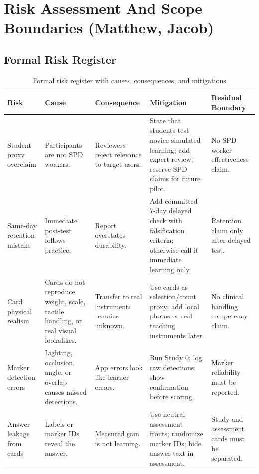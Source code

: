 \documentclass[10pt,a4paper]{article}
\begin{document}

\section{Risk Assessment And Scope Boundaries \hfill {\normalfont\small (Matthew, Jacob)}}
\label{sec:risk-assessment-and-scope-boundaries}
\subsection{Formal Risk Register}

\begin{table}[H]
\centering
\caption{Formal risk register with causes, consequences, and mitigations}
\label{tab:formal-risk-register-with-causes-consequences-and-mitigations}
\small\renewcommand{\arraystretch}{1.15}\setlength{\tabcolsep}{3pt}
\begin{tabularx}{\textwidth}{|>{\raggedright\arraybackslash}p{2.2cm}|>{\raggedright\arraybackslash}X|>{\raggedright\arraybackslash}p{2.5cm}|>{\raggedright\arraybackslash}X|>{\raggedright\arraybackslash}p{2.3cm}|}
\hline
Risk & Cause & Consequence & Mitigation & Residual Boundary \\
\hline
Student proxy overclaim & Participants are not SPD workers. & Reviewers reject relevance to target users. & State that students test novice simulated learning; add expert review; reserve SPD claims for future pilot. & No SPD worker effectiveness claim. \\
\hline
Same-day retention mistake & Immediate post-test follows practice. & Report overstates durability. & Add committed 7-day delayed check with falsification criteria; otherwise call it immediate learning only. & Retention claim only after delayed test. \\
\hline
Card physical realism & Cards do not reproduce weight, scale, tactile handling, or real visual lookalikes. & Transfer to real instruments remains unknown. & Use cards as selection/count proxy; add local photos or real teaching instruments later. & No clinical handling competency claim. \\
\hline
Marker detection errors & Lighting, occlusion, angle, or overlap causes missed detections. & App errors look like learner errors. & Run Study 0; log raw detections; show confirmation before scoring. & Marker reliability must be reported. \\
\hline
Answer leakage from cards & Labels or marker IDs reveal the answer. & Measured gain is not learning. & Use neutral assessment fronts; randomize marker IDs; hide answer text in assessment. & Study and assessment cards must be separated. \\

\end{tabularx}
\end{table}
\end{document}
